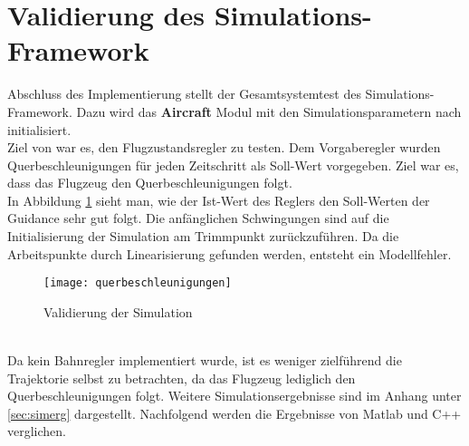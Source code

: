 \section{Validierung des Simulations-Framework}
Abschluss des Implementierung stellt der Gesamtsystemtest des Simulations-Framework. Dazu wird das \textbf{Aircraft} Modul mit den Simulationsparametern nach \cite{Olucak.15.02.2017} initialisiert.\\
Ziel von \cite{Olucak.15.02.2017} war es, den Flugzustandsregler zu testen. Dem Vorgaberegler wurden Querbeschleunigungen für jeden Zeitschritt als Soll-Wert vorgegeben. Ziel war es, dass das Flugzeug den Querbeschleunigungen folgt.\\ In Abbildung \ref{fig:valSim} sieht man, wie der Ist-Wert des Reglers den Soll-Werten der Guidance  sehr gut folgt. Die anfänglichen Schwingungen sind auf die Initialisierung der Simulation am Trimmpunkt zurückzuführen. Da die Arbeitspunkte durch Linearisierung gefunden werden, entsteht ein Modellfehler.
\begin{figure}[h]
	\centering
	\texttt{[image: querbeschleunigungen]}
	\caption{Validierung der Simulation}
	\label{fig:valSim}
\end{figure}\noindent\\
Da kein Bahnregler implementiert wurde, ist es weniger zielführend die Trajektorie selbst zu betrachten, da das Flugzeug lediglich den Querbeschleunigungen folgt. Weitere Simulationsergebnisse sind im Anhang unter \ref{sec:simerg} dargestellt. \newpage
Nachfolgend werden die Ergebnisse von Matlab und C++ verglichen.

